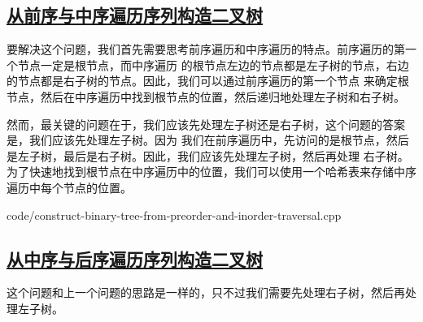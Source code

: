 \documentclass[../../main.tex]{subfiles}
\begin{document}
\subsection{\href{https://leetcode-cn.com/problems/construct-binary-tree-from-preorder-and-inorder-traversal/}
{从前序与中序遍历序列构造二叉树}}

要解决这个问题，我们首先需要思考前序遍历和中序遍历的特点。前序遍历的第一个节点一定是根节点，而中序遍历
的根节点左边的节点都是左子树的节点，右边的节点都是右子树的节点。因此，我们可以通过前序遍历的第一个节点
来确定根节点，然后在中序遍历中找到根节点的位置，然后递归地处理左子树和右子树。

然而，最关键的问题在于，我们应该先处理左子树还是右子树，这个问题的答案是，我们应该先处理左子树。因为
我们在前序遍历中，先访问的是根节点，然后是左子树，最后是右子树。因此，我们应该先处理左子树，然后再处理
右子树。为了快速地找到根节点在中序遍历中的位置，我们可以使用一个哈希表来存储中序遍历中每个节点的位置。


{code/construct-binary-tree-from-preorder-and-inorder-traversal.cpp}

\subsection{\href{https://leetcode-cn.com/problems/construct-binary-tree-from-inorder-and-postorder-traversal/}
{从中序与后序遍历序列构造二叉树}}

这个问题和上一个问题的思路是一样的，只不过我们需要先处理右子树，然后再处理左子树。


\end{document}
